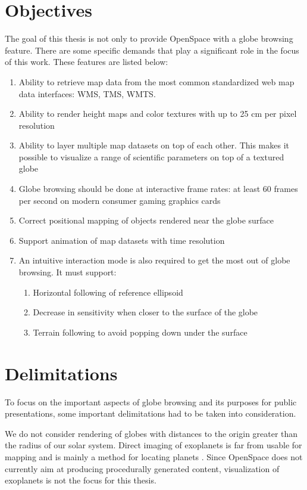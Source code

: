 \section{Objectives}

The goal of this thesis is not only to provide OpenSpace with a globe browsing feature. There are some specific demands that play a significant role in the focus of this work. These features are listed below:

\begin{enumerate}
    \item Ability to retrieve map data from the most common standardized web map data interfaces: WMS, TMS, WMTS.
    \item Ability to render height maps and color textures with up to 25 cm per pixel resolution 
    \item Ability to layer multiple map datasets on top of each other. This makes it possible to visualize a range of scientific parameters on top of a textured globe
    \item Globe browsing should be done at interactive frame rates: at least 60 frames per second on modern consumer gaming graphics cards
    \item Correct positional mapping of objects rendered near the globe surface
    \item Support animation of map datasets with time resolution
    \item An intuitive interaction mode is also required to get the most out of globe browsing. It must support:
	\begin{enumerate}
    		\item Horizontal following of reference ellipsoid
		\item Decrease in sensitivity when closer to the surface of the globe
		\item Terrain following to avoid popping down under the surface
	\end{enumerate}
\end{enumerate}

\section{Delimitations}

To focus on the important aspects of globe browsing and its purposes for public presentations, some important delimitations had to be taken into consideration.

We do not consider rendering of globes with distances to the origin greater than the radius of our solar system. Direct imaging of exoplanets is far from usable for mapping and is mainly a method for locating planets \cite{exoplanets}. Since OpenSpace does not currently aim at producing procedurally generated content, visualization of exoplanets is not the focus for this thesis.

